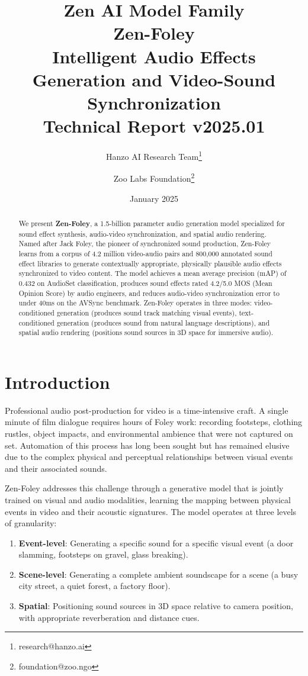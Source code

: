 \documentclass[11pt,a4paper]{article}
\title{
    \vspace{-2cm}
    \Large \textbf{Zen AI Model Family} \\
    \vspace{0.5cm}
    \Huge \textbf{Zen-Foley} \\
    \vspace{0.3cm}
    \large Intelligent Audio Effects Generation and Video-Sound Synchronization \\
    \vspace{0.5cm}
    \normalsize Technical Report v2025.01
}
\author{
    Hanzo AI Research Team\thanks{research@hanzo.ai} \and
    Zoo Labs Foundation\thanks{foundation@zoo.ngo}
}
\date{January 2025}
\begin{document}
\maketitle

\begin{abstract}
We present \textbf{Zen-Foley}, a 1.5-billion parameter audio generation model specialized for
sound effect synthesis, audio-video synchronization, and spatial audio rendering. Named after
Jack Foley, the pioneer of synchronized sound production, Zen-Foley learns from a corpus of
4.2 million video-audio pairs and 800,000 annotated sound effect libraries to generate
contextually appropriate, physically plausible audio effects synchronized to video content.
The model achieves a mean average precision (mAP) of 0.432 on AudioSet classification,
produces sound effects rated 4.2/5.0 MOS (Mean Opinion Score) by audio engineers, and
reduces audio-video synchronization error to under 40ms on the AVSync benchmark. Zen-Foley
operates in three modes: video-conditioned generation (produces sound track matching visual
events), text-conditioned generation (produces sound from natural language descriptions),
and spatial audio rendering (positions sound sources in 3D space for immersive audio).
\end{abstract}

\tableofcontents
\newpage

\section{Introduction}

Professional audio post-production for video is a time-intensive craft. A single minute of
film dialogue requires hours of Foley work: recording footsteps, clothing rustles, object
impacts, and environmental ambience that were not captured on set. Automation of this process
has long been sought but has remained elusive due to the complex physical and perceptual
relationships between visual events and their associated sounds.

Zen-Foley addresses this challenge through a generative model that is jointly trained on
visual and audio modalities, learning the mapping between physical events in video and their
acoustic signatures. The model operates at three levels of granularity:

\begin{enumerate}
    \item \textbf{Event-level}: Generating a specific sound for a specific visual event
    (a door slamming, footsteps on gravel, glass breaking).
    \item \textbf{Scene-level}: Generating a complete ambient soundscape for a scene
    (a busy city street, a quiet forest, a factory floor).
    \item \textbf{Spatial}: Positioning sound sources in 3D space relative to camera
    position, with appropriate reverberation and distance cues.
\end{enumerate}
\end{document}
